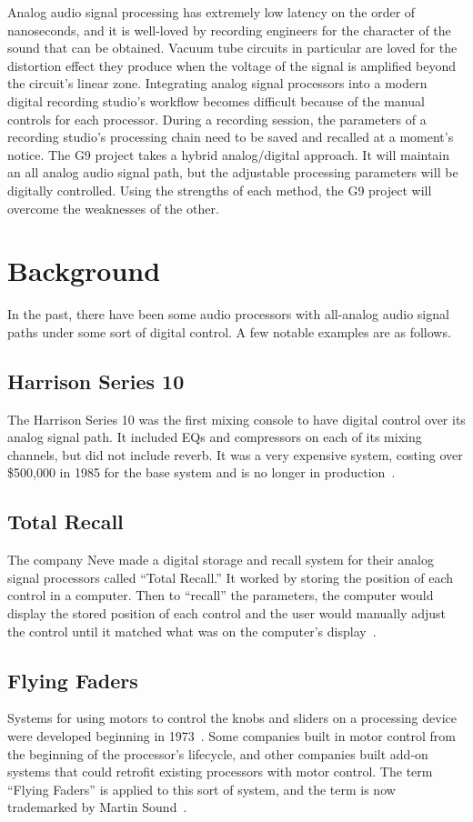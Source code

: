 \documentclass[journal]{IEEEtran}
\begin{document}
	Analog audio signal processing has extremely low latency on the order of nanoseconds, and it is well-loved by recording engineers for the character of the sound that can be obtained. Vacuum tube circuits in particular are loved for the distortion effect they produce when the voltage of the signal is amplified beyond the circuit’s linear zone. Integrating analog signal processors into a modern digital recording studio’s workflow becomes difficult because of the manual controls for each processor. During a recording session, the parameters of a recording studio’s processing chain need to be saved and recalled at a moment’s notice. The G9 project takes a hybrid analog/digital approach. It will maintain an all analog audio signal path, but the adjustable processing parameters will be digitally controlled. Using the strengths of each method, the G9 project will overcome the weaknesses of the other.
	
	
	\section{Background}
	In the past, there have been some audio processors with all-analog audio signal paths under some sort of digital control. A few notable examples are as follows.
	
	\subsection{Harrison Series 10}
	The Harrison Series 10 was the first mixing console to have digital control over its analog signal path. It included EQs and compressors on each of its mixing channels, but did not include reverb. It was a very expensive system, costing over \$500,000 in 1985 for the base system and is no longer in production~\cite{harrisonSeries10}.
	
	\subsection{Total Recall}
	The company Neve made a digital storage and recall system for their analog signal processors called ``Total Recall.'' It worked by storing the position of each control in a computer. Then to ``recall'' the parameters, the computer would display the stored position of each control and the user would manually adjust the control until it matched what was on the computer's display~\cite{totalRecall}.
	
	\subsection{Flying Faders \texttrademark}
	Systems for using motors to control the knobs and sliders on a processing device were developed beginning in 1973~\cite{api}.  Some companies built in motor control from the beginning of the processor's lifecycle, and other companies built add-on systems that could retrofit existing processors with motor control. The term ``Flying Faders\texttrademark'' is applied to this sort of system, and the term is now trademarked by Martin Sound~\cite{flyingFaders}.
	
\end{document}
